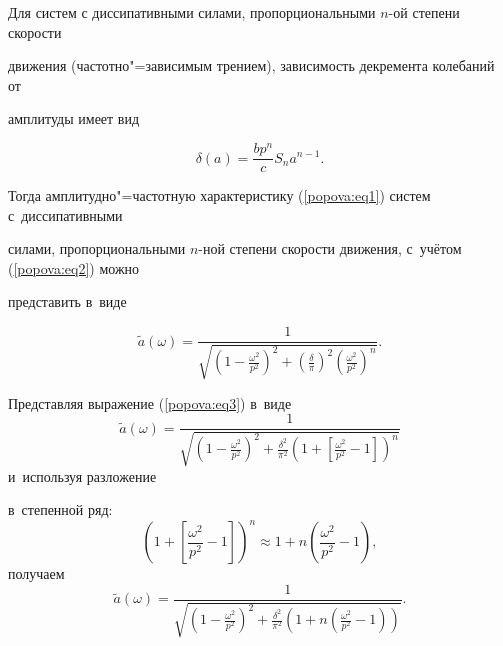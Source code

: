 Для систем с диссипативными силами, пропорциональными $n$-ой степени скорости 


движения (частотно"=зависимым трением), зависимость декремента колебаний от 


амплитуды имеет вид


\begin{equation}


\label{popova:eq2}


\delta (a) = \frac{bp^n}{c}S_n a^{n - 1}.


\end{equation}





Тогда амплитудно"=частотную характеристику (\ref{popova:eq1}) систем с~диссипативными 


силами, пропорциональными $n$-ной степени скорости движения, с~учётом (\ref{popova:eq2}) можно 


представить в~виде


\begin{equation}


\label{popova:eq3}


\tilde {a}(\omega ) = \frac{1}{\sqrt {\left( {1 - \frac{\omega ^2}{p^2}} 


\right)^2 + \left( {\frac{\delta }{\pi }} \right)^2\left( {\frac{\omega 


^2}{p^2}} \right)^n} }.


\end{equation}


Представляя выражение (\ref{popova:eq3}) в~виде $$\tilde {a}(\omega ) = \frac{1}{\sqrt 


{\left( {1 - \frac{\omega ^2}{p^2}} \right)^2 + \frac{\delta ^2}{\pi 


^2}\left( {1 + \left[ {\frac{\omega ^2}{p^2} - 1} \right]} \right)^n} }$$ и~используя разложение 


в~степенной ряд: $$\left( {1 + \left[ 


{\frac{\omega ^2}{p^2} - 1} \right]} \right)^n \approx 1 + n\left( 


{\frac{\omega ^2}{p^2} - 1} \right),$$ получаем $$\tilde {a}(\omega ) = 


\frac{1}{\sqrt {\left( {1 - \frac{\omega ^2}{p^2}} \right)^2 + \frac{\delta 


^2}{\pi ^2}\left( {1 + n\left( {\frac{\omega ^2}{p^2} - 1} \right)} \right)} 


}.$$





